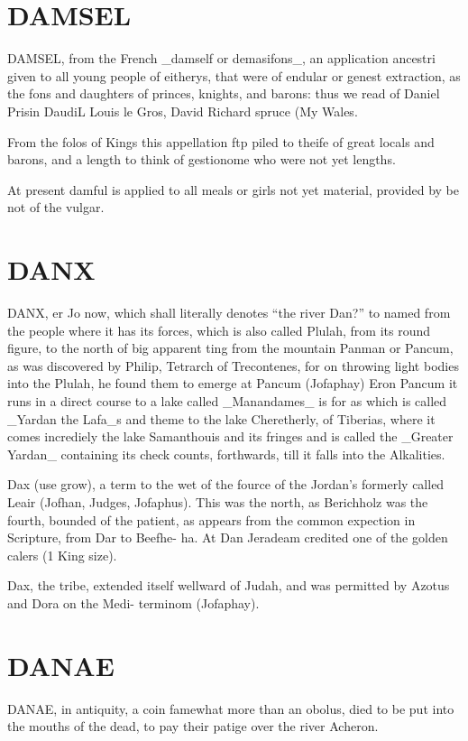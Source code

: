 \documentclass{article}
\begin{document}
\section*{DAMSEL}
DAMSEL, from the French \_damself or demasifons\_, an application ancestri given to all young people of eitherys, that were of endular or genest extraction, as the fons and daughters of princes, knights, and barons: thus we read of Daniel Prisin DaudiL Louis le Gros, David Richard spruce (My Wales.

From the folos of Kings this appellation ftp piled to theife of great locals and barons, and a length to think of gestionome who were not yet lengths.

At present damful is applied to all meals or girls not yet material, provided by be not of the vulgar.

\section*{DANX}
DANX, er Jo now, which shall literally denotes “the river Dan?” to named from the people where it has its forces, which is also called Plulah, from its round figure, to the north of big apparent ting from the mountain Panman or Pancum, as was discovered by Philip, Tetrarch of Trecontenes, for on throwing light bodies into the Plulah, he found them to emerge at Pancum (Jofaphay) Eron Pancum it runs in a direct course to a lake called \_Manandames\_ is for as which is called \_Yardan the Lafa\_s and theme to the lake Cheretherly, of Tiberias, where it comes incrediely the lake Samanthouis and its fringes and is called the \_Greater Yardan\_ containing its check counts, forthwards, till it falls into the Alkalities.

Dax (use grow), a term to the wet of the fource of the Jordan’s formerly called Leair (Jofhan, Judges, Jofaphus). This was the north, as Berichholz was the fourth, bounded of the patient, as appears from the common expection in Scripture, from Dar to Beefhe- ha. At Dan Jeradeam credited one of the golden calers (1 King size).

Dax, the tribe, extended itself wellward of Judah, and was permitted by Azotus and Dora on the Medi- terminom (Jofaphay).

\section*{DANAE}
DANAE, in antiquity, a coin famewhat more than an obolus, died to be put into the mouths of the dead, to pay their patige over the river Acheron.
\end{document}
